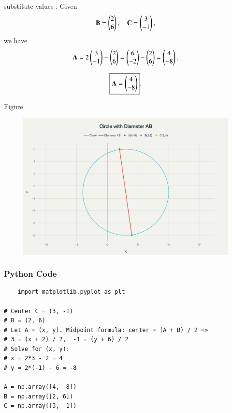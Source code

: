 \documentclass{beamer}
\begin{document}
\begin{frame}{substitute values :}
 Given
\[
\mathbf{B} = \begin{pmatrix}2 \\ 6\end{pmatrix}, \quad \mathbf{C} = \begin{pmatrix}3 \\ -1\end{pmatrix},
\]
we have
\[
\mathbf{A} = 2 \begin{pmatrix}3 \\ -1\end{pmatrix} - \begin{pmatrix}2 \\ 6\end{pmatrix} = \begin{pmatrix}6 \\ -2\end{pmatrix} - \begin{pmatrix}2 \\ 6\end{pmatrix} = \begin{pmatrix}4 \\ -8\end{pmatrix}.
\]

\bigskip

\[
\boxed{\mathbf{A} = \begin{pmatrix}4 \\ -8\end{pmatrix}}.
\]

\end{frame}

\begin{frame}{Figure}
  
\begin{figure}[H]
    \centering
    \includegraphics[width=0.5\linewidth]{figs/fig.png}
    \caption{}
    \label{fig:placeholder}
\end{figure}
  
\end{frame}

\begin{frame}[fragile]
    \frametitle{Python Code}
    \begin{lstlisting}
    import matplotlib.pyplot as plt

# Center C = (3, -1)
# B = (2, 6)
# Let A = (x, y). Midpoint formula: center = (A + B) / 2 =>
# 3 = (x + 2) / 2,  -1 = (y + 6) / 2
# Solve for (x, y):
# x = 2*3 - 2 = 4
# y = 2*(-1) - 6 = -8

A = np.array([4, -8])
B = np.array([2, 6])
C = np.array([3, -1])
\end{lstlisting}
\end{frame}
\end{document}
